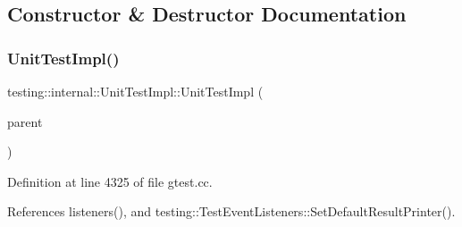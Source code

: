 \subsection{Constructor \& Destructor Documentation}
\mbox{\label{classtesting_1_1internal_1_1UnitTestImpl_a5fb75faa88ee71f26e16473455b70839}} 
\subsubsection{\texorpdfstring{Unit\+Test\+Impl()}{UnitTestImpl()}}
{\footnotesize\ttfamily testing\+::internal\+::\+Unit\+Test\+Impl\+::\+Unit\+Test\+Impl (\begin{DoxyParamCaption}\item[{\hyperlink{classtesting_1_1UnitTest}{Unit\+Test} $\ast$}]{parent }\end{DoxyParamCaption})\hspace{0.3cm}{\ttfamily [explicit]}}



Definition at line 4325 of file gtest.\+cc.



References listeners(), and testing\+::\+Test\+Event\+Listeners\+::\+Set\+Default\+Result\+Printer().


